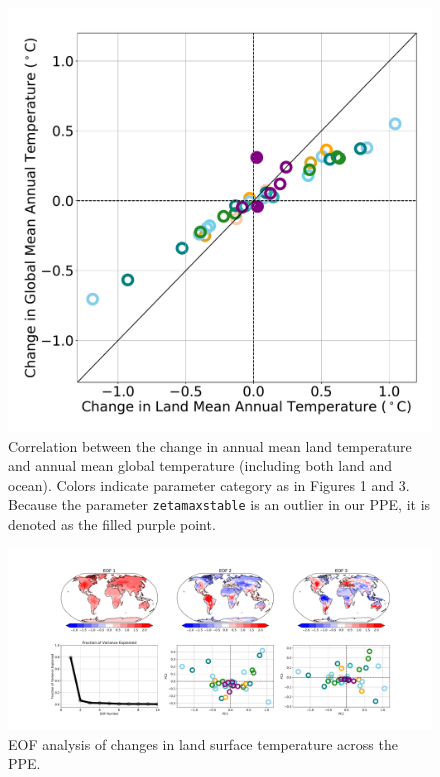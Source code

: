 \documentclass[draft,grl]{agutexSI2019}
\begin{document}
\begin{figure}[htb!]
\noindent\includegraphics[width=\textwidth]{writing/figs/Figure_S3.pdf}
\caption{Correlation between the change in annual mean land temperature and annual mean global temperature (including both land and ocean). Colors indicate parameter category as in Figures 1 and 3. Because the parameter \texttt{zetamaxstable} is an outlier in our PPE, it is denoted as the filled purple point.}
\label{fig:supp_coupled_Ts_land_vs_ocean_maps}
\end{figure}

\begin{figure}[htb!]
\noindent\includegraphics[width=\textwidth]{writing/figs/Figure_S_TSKIN_EOF_summary.pdf}
\caption{EOF analysis of changes in land surface temperature across the PPE. }
\label{fig:supp_EOF_analysis_Temp}
\end{figure}
\end{document}

